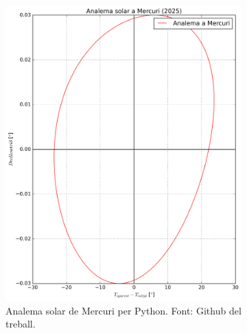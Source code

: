 \documentclass[a4paper, 11pt]{article}
\begin{document}
\begin{figure}[h!]
    \centering
    \begin{subfigure}{0.45\textwidth}
        \centering
        \includegraphics[width=\textwidth]{images/analema_Mercuri.png}
        \caption{Analema solar de Mercuri per Python. Font: Github del treball.}
    \end{subfigure}
    \hspace{0.05\textwidth}
    \begin{subfigure}{0.45\textwidth}
        \centering

\end{subfigure}
\end{figure}
\end{document}

